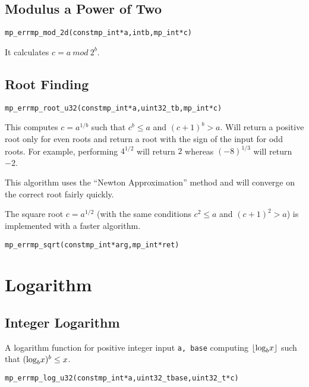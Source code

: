 \documentclass[synpaper]{book}
\def\log{{\rm log}}
\def\mod{{\mathit\ mod\ }}
\newcommand{\floor}[1]{\left\lfloor{#1}\right\rfloor}
\begin{document}
\section{Modulus a Power of Two}
\begin{alltt}
mp_err mp_mod_2d(const mp_int *a, int b, mp_int *c)
\end{alltt}
It calculates $c = a \mod 2^b$.

\section{Root Finding}
\begin{alltt}
mp_err mp_root_u32(const mp_int *a, uint32_t b, mp_int *c)
\end{alltt}
This computes $c = a^{1/b}$ such that $c^b \le a$ and $(c+1)^b > a$. Will return a positive root only for even roots and return
a root with the sign of the input for odd roots.  For example, performing $4^{1/2}$ will return $2$ whereas $(-8)^{1/3}$
will return $-2$.

This algorithm uses the ``Newton Approximation'' method and will converge on the correct root fairly quickly.

The square root  $c = a^{1/2}$ (with the same conditions $c^2 \le a$ and $(c+1)^2 > a$) is implemented with a faster algorithm.

\begin{alltt}
mp_err mp_sqrt(const mp_int *arg, mp_int *ret)
\end{alltt}


\chapter{Logarithm}
\section{Integer Logarithm}
A logarithm function for positive integer input \texttt{a, base} computing  $\floor{\log_bx}$ such that $(\log_b x)^b \le x$.
\begin{alltt}
mp_err mp_log_u32(const mp_int *a, uint32_t base, uint32_t *c)
\end{alltt}
\end{document}
